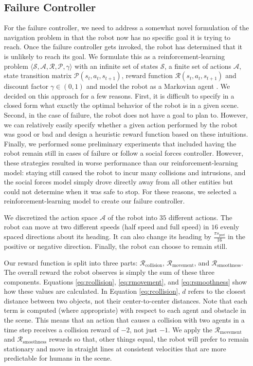 \documentclass[letterpaper, 10 pt, conference]{ieeeconf}  %
\begin{document}
	\subsection{Failure Controller}
		For the failure controller, we need to address a somewhat novel formulation of the navigation problem in that the robot now has no specific goal it is trying to reach. Once the failure controller gets invoked, the robot has determined that it is unlikely to reach its goal. We formulate this as a reinforcement-learning problem $\langle\mathcal{S}, \mathcal{A}, \mathcal{R}, \mathcal{P}, \gamma\rangle$ with an infinite set of states $\mathcal{S}$, a finite set of actions $\mathcal{A}$, state transition matrix $\mathcal{P}(s_t, a_t, s_{t+1})$, reward function $\mathcal{R}(s_t, a_t, s_{t+1})$ and discount factor $\gamma \in (0, 1)$ and model the robot as a Markovian agent \cite{suttonandbarto}. We decided on this approach for a few reasons. First, it is difficult to specify in a closed form what exactly the optimal behavior of the robot is in a given scene. Second, in the case of failure, the robot does not have a goal to plan to. However, we can relatively easily specify whether a given action performed by the robot was good or bad and design a heuristic reward function based on these intuitions. Finally, we performed some preliminary experiments that included having the robot remain still in cases of failure or follow a social forces controller. However, these strategies resulted in worse performance than our reinforcement-learning model: staying still caused the robot to incur many collisions and intrusions, and the social forces model simply drove directly away from all other entities but could not determine when it was safe to stop. For these reasons, we selected a reinforcement-learning model to create our failure controller.
		
		We discretized the action space $\mathcal{A}$ of the robot into $35$ different actions. The robot can move at two different speeds (half speed and full speed) in $16$ evenly spaced directions about its heading. It can also change its heading by $\frac{\pi s_{\text{pref}}}{16}$ in the positive or negative direction. Finally, the robot can choose to remain still.
		
		Our reward function is split into three parts: $\mathcal{R}_{\text{collision}}$, $\mathcal{R}_{\text{movement}}$, and $\mathcal{R}_{\text{smoothness}}$. The overall reward the robot observes is simply the sum of these three components. Equations \ref{eq:rcollision}, \ref{eq:rmovement}, and \ref{eq:rsmoothness} show how these values are calculated. In Equation \ref{eq:rcollision}, $d$ refers to the closest distance between two objects, not their center-to-center distances. Note that each term is computed (where appropriate) with respect to each agent and obstacle in the scene. This means that an action that causes a collision with two agents in a time step receives a collision reward of $-2$, not just $-1$. We apply the $\mathcal{R}_{\text{movement}}$ and $\mathcal{R}_{\text{smoothness}}$ rewards so that, other things equal, the robot will prefer to remain stationary and move in straight lines at consistent velocities that are more predictable for humans in the scene.
		
\end{document}

